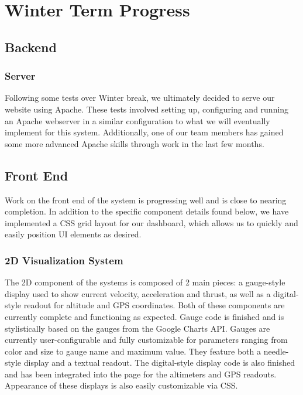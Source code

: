 \documentclass[journal,10pt,onecolumn,compsoc]{IEEEtran}
\begin{document}
\section{Winter Term Progress}

	\subsection{Backend}
		
		\subsubsection{}
			
		\subsubsection{}
		
		\subsubsection{Server}
			Following some tests over Winter break, we ultimately decided to serve our website using Apache.
			These tests involved setting up, configuring and running an Apache webserver in a similar configuration to what we will eventually implement for this system.
			Additionally, one of our team members has gained some more advanced Apache skills through work in the last few months.
	
	\subsection{Front End}
		Work on the front end of the system is progressing well and is close to nearing completion.
		In addition to the specific component details found below, we have implemented a CSS grid layout for our dashboard, which allows us to quickly and easily position UI elements as desired.
	
		\subsubsection{2D Visualization System}
			The 2D component of the systems is composed of 2 main pieces: a gauge-style display used to show current velocity, acceleration and thrust, as well as a digital-style readout for altitude and GPS coordinates.
			Both of these components are currently complete and functioning as expected.
			Gauge code is finished and is stylistically based on the gauges from the Google Charts API.
			Gauges are currently user-configurable and fully customizable for parameters ranging from color and size to gauge name and maximum value.
			They feature both a needle-style display and a textual readout.
			The digital-style display code is also finished and has been integrated into the page for the altimeters and GPS readouts. 
			Appearance of these displays is also easily customizable via CSS.
			
\end{document}
